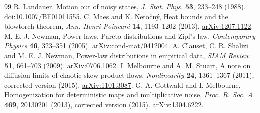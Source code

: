 \documentclass[11pt,a4paper]{article}
\begin{document}
\begin{thebibliography}{99}
 R. Landauer, Motion out of noisy states,
\emph{J. Stat. Phys.} \textbf{53}, 233--248 (1988).
\href{https://doi.org/10.1007/BF01011555}{doi:10.1007/BF01011555}.
 C. Maes and K. Neto\v{c}n\'y, Heat bounds and the blowtorch theorem,
\emph{Ann. Henri Poincar\'e} \textbf{14}, 1193--1202 (2013).
\href{https://arxiv.org/abs/1207.1122}{arXiv:1207.1122}.
 M. E. J. Newman, Power laws, Pareto distributions and Zipf's law,
\emph{Contemporary Physics} \textbf{46}, 323--351 (2005).
\href{https://arxiv.org/abs/cond-mat/0412004}{arXiv:cond-mat/0412004}.
 A. Clauset, C. R. Shalizi and M. E. J. Newman,
Power-law distributions in empirical data,
\emph{SIAM Review} \textbf{51}, 661--703 (2009).
\href{https://arxiv.org/abs/0706.1062}{arXiv:0706.1062}.
 I. Melbourne and A. M. Stuart,
A note on diffusion limits of chaotic skew-product flows,
\emph{Nonlinearity} \textbf{24}, 1361--1367 (2011), corrected version (2015).
\href{https://arxiv.org/abs/1101.3087}{arXiv:1101.3087}.
 G. A. Gottwald and I. Melbourne,
Homogenization for deterministic maps and multiplicative noise,
\emph{Proc. R. Soc. A} \textbf{469}, 20130201 (2013), corrected version (2015).
\href{https://arxiv.org/abs/1304.6222}{arXiv:1304.6222}.
\end{thebibliography}
\end{document}
